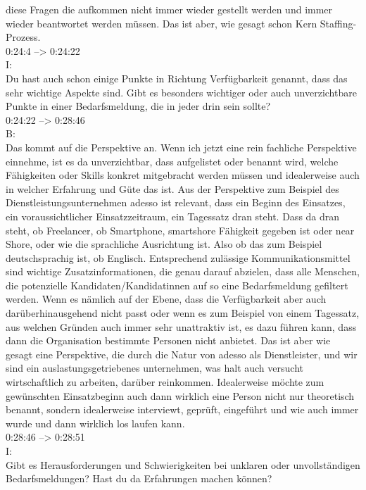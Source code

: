 diese Fragen die aufkommen nicht immer wieder gestellt werden und immer wieder beantwortet werden müssen. Das ist aber, wie gesagt schon Kern Staffing-Prozess.\\

0:24:4 --> 0:24:22\\
I:\\
Du hast auch schon einige Punkte in Richtung Verfügbarkeit genannt, dass das sehr wichtige Aspekte sind. Gibt es besonders wichtiger oder auch unverzichtbare Punkte in einer Bedarfsmeldung, die in jeder drin sein sollte?\\

0:24:22 --> 0:28:46\\
B:\\
Das kommt auf die Perspektive an. Wenn ich jetzt eine rein fachliche Perspektive einnehme, ist es da unverzichtbar, dass aufgelistet oder benannt wird, welche Fähigkeiten oder Skills konkret mitgebracht werden müssen und idealerweise auch in welcher Erfahrung und Güte das ist. Aus der Perspektive zum Beispiel des Dienstleistungsunternehmen adesso ist relevant, dass ein Beginn des Einsatzes, ein voraussichtlicher Einsatzzeitraum, ein Tagessatz dran steht. Dass da dran steht, ob Freelancer, ob Smartphone, smartshore Fähigkeit gegeben ist oder near Shore, oder wie die sprachliche Ausrichtung ist. Also ob das zum Beispiel deutschsprachig ist, ob Englisch. Entsprechend zulässige Kommunikationsmittel sind wichtige Zusatzinformationen, die genau darauf abzielen, dass alle Menschen, die potenzielle Kandidaten/Kandidatinnen auf so eine Bedarfsmeldung gefiltert werden. Wenn es nämlich auf der Ebene, dass die Verfügbarkeit aber auch darüberhinausgehend nicht passt oder wenn es zum Beispiel von einem Tagessatz, aus welchen Gründen auch immer sehr unattraktiv ist, es dazu führen kann, dass dann die Organisation bestimmte Personen nicht anbietet. Das ist aber wie gesagt eine Perspektive, die durch die Natur von adesso als Dienstleister, und wir sind ein auslastungsgetriebenes unternehmen, was halt auch versucht wirtschaftlich zu arbeiten, darüber reinkommen. Idealerweise möchte zum gewünschten Einsatzbeginn auch dann wirklich eine Person nicht nur theoretisch benannt, sondern idealerweise interviewt, geprüft, eingeführt und wie auch immer wurde und dann wirklich los laufen kann.\\

0:28:46 --> 0:28:51\\
I:\\
Gibt es Herausforderungen und Schwierigkeiten bei unklaren oder unvollständigen Bedarfsmeldungen? Hast du da Erfahrungen machen können?\\

